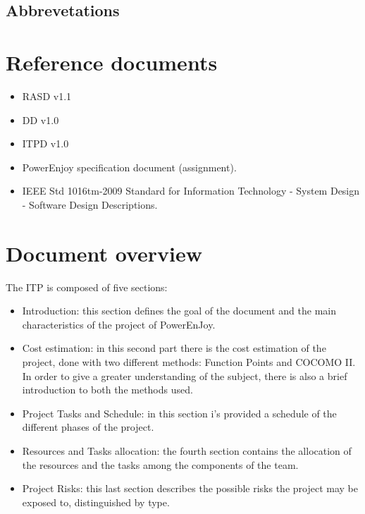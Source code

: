 \subsection{Abbrevetations}

\section{Reference documents}

\begin{itemize}
\item RASD v1.1
\item DD v1.0
\item ITPD v1.0
\item PowerEnjoy specification document (assignment).
\item IEEE Std 1016tm-2009 Standard for Information Technology - System Design - Software Design Descriptions.
\end{itemize}

\section{Document overview}
The ITP is composed of five sections:
\begin{itemize}
\item Introduction: this section defines the goal of the document and the main characteristics of the project of PowerEnJoy.
\item Cost estimation: in this second part there is the cost estimation of the project, done with two different methods: Function Points and COCOMO II. In order to give a greater understanding of the subject, there is also a brief introduction to both the methods used.
\item Project Tasks and Schedule: in this section i’s provided a schedule of the different phases of the project.
\item Resources and Tasks allocation: the fourth section contains the allocation of the resources and the tasks among the components of the team.
\item Project Risks: this last section describes the possible risks the project may be exposed to, distinguished by type.
\end{itemize}
